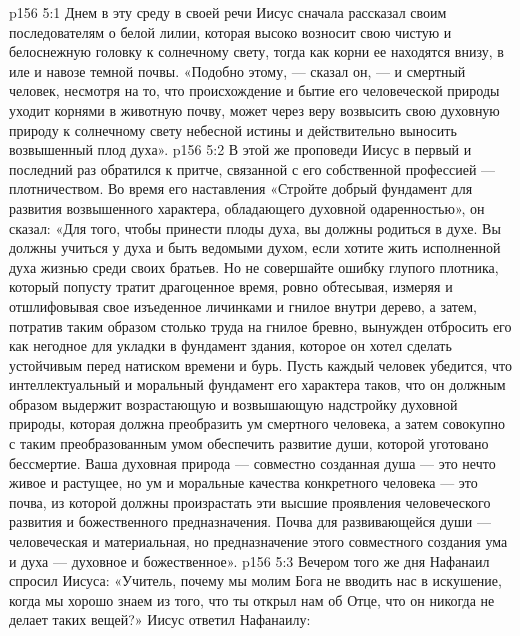 \vs p156 5:1 Днем в эту среду в своей речи Иисус сначала рассказал своим последователям о белой лилии, которая высоко возносит свою чистую и белоснежную головку к солнечному свету, тогда как корни ее находятся внизу, в иле и навозе темной почвы. «Подобно этому, --- сказал он, --- и смертный человек, несмотря на то, что происхождение и бытие его человеческой природы уходит корнями в животную почву, может через веру возвысить свою духовную природу к солнечному свету небесной истины и действительно выносить возвышенный плод духа».
\vs p156 5:2 В этой же проповеди Иисус в первый и последний раз обратился к притче, связанной с его собственной профессией --- плотничеством. Во время его наставления «Стройте добрый фундамент для развития возвышенного характера, обладающего духовной одаренностью», он сказал: «Для того, чтобы принести плоды духа, вы должны родиться в духе. Вы должны учиться у духа и быть ведомыми духом, если хотите жить исполненной духа жизнью среди своих братьев. Но не совершайте ошибку глупого плотника, который попусту тратит драгоценное время, ровно обтесывая, измеряя и отшлифовывая свое изъеденное личинками и гнилое внутри дерево, а затем, потратив таким образом столько труда на гнилое бревно, вынужден отбросить его как негодное для укладки в фундамент здания, которое он хотел сделать устойчивым перед натиском времени и бурь. Пусть каждый человек убедится, что интеллектуальный и моральный фундамент его характера таков, что он должным образом выдержит возрастающую и возвышающую надстройку духовной природы, которая должна преобразить ум смертного человека, а затем совокупно с таким преобразованным умом обеспечить развитие души, которой уготовано бессмертие. Ваша духовная природа --- совместно созданная душа --- это нечто живое и растущее, но ум и моральные качества конкретного человека --- это почва, из которой должны произрастать эти высшие проявления человеческого развития и божественного предназначения. Почва для развивающейся души --- человеческая и материальная, но предназначение этого совместного создания ума и духа --- духовное и божественное».
\vs p156 5:3 Вечером того же дня Нафанаил спросил Иисуса: «Учитель, почему мы молим Бога не вводить нас в искушение, когда мы хорошо знаем из того, что ты открыл нам об Отце, что он никогда не делает таких вещей?» Иисус ответил Нафанаилу:
